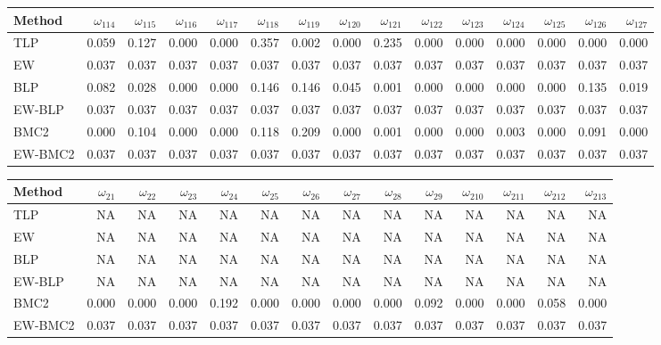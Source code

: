 \documentclass[
]{article}
\begin{document}
\begin{tabular}{lrrrrrrrrrrrrrr}
\toprule
Method & $\omega_{114}$ & $\omega_{115}$ & $\omega_{116}$ & $\omega_{117}$ & $\omega_{118}$ & $\omega_{119}$ & $\omega_{120}$ & $\omega_{121}$ & $\omega_{122}$ & $\omega_{123}$ & $\omega_{124}$ & $\omega_{125}$ & $\omega_{126}$ & $\omega_{127}$\\
\midrule
TLP & 0.059 & 0.127 & 0.000 & 0.000 & 0.357 & 0.002 & 0.000 & 0.235 & 0.000 & 0.000 & 0.000 & 0.000 & 0.000 & 0.000\\
EW & 0.037 & 0.037 & 0.037 & 0.037 & 0.037 & 0.037 & 0.037 & 0.037 & 0.037 & 0.037 & 0.037 & 0.037 & 0.037 & 0.037\\
BLP & 0.082 & 0.028 & 0.000 & 0.000 & 0.146 & 0.146 & 0.045 & 0.001 & 0.000 & 0.000 & 0.000 & 0.000 & 0.135 & 0.019\\
EW-BLP & 0.037 & 0.037 & 0.037 & 0.037 & 0.037 & 0.037 & 0.037 & 0.037 & 0.037 & 0.037 & 0.037 & 0.037 & 0.037 & 0.037\\
BMC2 & 0.000 & 0.104 & 0.000 & 0.000 & 0.118 & 0.209 & 0.000 & 0.001 & 0.000 & 0.000 & 0.003 & 0.000 & 0.091 & 0.000\\
EW-BMC2 & 0.037 & 0.037 & 0.037 & 0.037 & 0.037 & 0.037 & 0.037 & 0.037 & 0.037 & 0.037 & 0.037 & 0.037 & 0.037 & 0.037\\
\bottomrule
\end{tabular}

\begin{tabular}{lrrrrrrrrrrrrr}
\toprule
Method & $\omega_{21}$ & $\omega_{22}$ & $\omega_{23}$ & $\omega_{24}$ & $\omega_{25}$ & $\omega_{26}$ & $\omega_{27}$ & $\omega_{28}$ & $\omega_{29}$ & $\omega_{210}$ & $\omega_{211}$ & $\omega_{212}$ & $\omega_{213}$\\
\midrule
TLP & NA & NA & NA & NA & NA & NA & NA & NA & NA & NA & NA & NA & NA\\
EW & NA & NA & NA & NA & NA & NA & NA & NA & NA & NA & NA & NA & NA\\
BLP & NA & NA & NA & NA & NA & NA & NA & NA & NA & NA & NA & NA & NA\\
EW-BLP & NA & NA & NA & NA & NA & NA & NA & NA & NA & NA & NA & NA & NA\\
BMC2 & 0.000 & 0.000 & 0.000 & 0.192 & 0.000 & 0.000 & 0.000 & 0.000 & 0.092 & 0.000 & 0.000 & 0.058 & 0.000\\
EW-BMC2 & 0.037 & 0.037 & 0.037 & 0.037 & 0.037 & 0.037 & 0.037 & 0.037 & 0.037 & 0.037 & 0.037 & 0.037 & 0.037\\
\bottomrule
\end{tabular}
\end{document}
